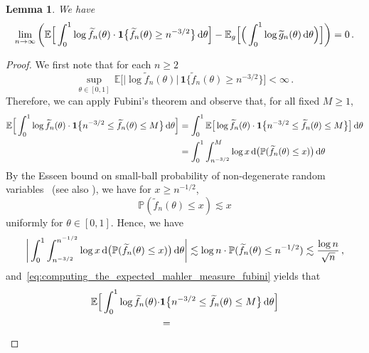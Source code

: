 \documentclass[11pt]{amsart}
\newtheorem{lemma}[theorem]{Lemma}
\theoremstyle{remark}
\theoremstyle{definition}
\newcommand{\bP}{\mathbb P}
\newcommand{\bE}{\mathbb E}
\newcommand{\one}{\boldsymbol{1}}
\begin{document}
    \begin{lemma}
        \label{lemma:mahler_measure_of_gaussian_and_original_are_close}
        We have
        \[
        \lim_{n\to\infty} \bigg( \bE\Big[ \int_{0}^1 \log \widetilde{f}_n(\theta) \cdot  \one\big\{ \widetilde f_n(\theta) \ge n^{-3/2}\big\} \, {\rm d}\theta \Big] -  \bE_g\Big[ \Big(\int_{0}^1 \log \widetilde{g}_n(\theta) \, {\rm d}\theta\Big) \Big] \bigg) = 0 \, .
        \]
    \end{lemma}
    \begin{proof}
        We first note that for each $n\ge 2$
        \[
        \sup_{\theta\in[0,1]} \, \bE\Big[\big|\log \widetilde{f}_n(\theta) \big| \, \one\big\{ \widetilde f_n(\theta) \ge n^{-3/2}\big\} \Big] < \infty \, .
        \]
        Therefore, we can apply Fubini's theorem and observe that, for all fixed $M\ge 1$, 
        \begin{align}
        \label{eq:computing_the_expected_mahler_measure_fubini}
            \nonumber \bE\Big[ \int_{0}^1 \log \widetilde{f}_n(\theta) \cdot   \one\big\{  n^{-3/2} \le \widetilde f_n(\theta) \le M \big\} \, {\rm d}\theta \Big]  &= \int_{0}^{1} \bE\big[\log \widetilde{f}_n(\theta) \cdot \one\big\{  n^{-3/2} \le \widetilde f_n(\theta) \le M \big\} \big] \, {\rm d}\theta \\  &= \int_{0}^{1} \int_{n^{-3/2}}^M \log x  \, {\rm d} \big(\bP(\widetilde f_n(\theta) \le x) \big) \, {\rm d}\theta
        \end{align}
        By the Esseen bound on small-ball probability of non-degenerate random variables~\cite{Esseen} (see also \cite[Lemma~2.4]{Michelen-Yakir-root-separation}), we have for $x\ge n^{-1/2}$,
        \begin{equation}
            \label{eq:eseeen_inequality}
            \bP(\widetilde f_n(\theta) \le x) \lesssim x  
        \end{equation}
        uniformly for $\theta\in[0,1]$. Hence, we have
        \[
        \bigg| \int_{0}^{1} \int_{n^{-3/2}}^{n^{-1/2}} \log x  \, {\rm d} \big(\bP(\widetilde f_n(\theta) \le x) \big) \, {\rm d}\theta \bigg| \lesssim \log n  \cdot  \bP(\widetilde f_n(\theta) \le n^{-1/2}) \lesssim \frac{\log n}{\sqrt{n}} \, , 
        \]
        and~\eqref{eq:computing_the_expected_mahler_measure_fubini} yields that
        \begin{align*}
        \bE\Big[ \int_{0}^1 \log \widetilde{f}_n(\theta) \cdot  & \one\big\{  n^{-3/2} \le \widetilde f_n(\theta) \le M \big\} \, {\rm d}\theta \Big]  \\ & =

\end{align*}
\end{proof}
\end{document}

